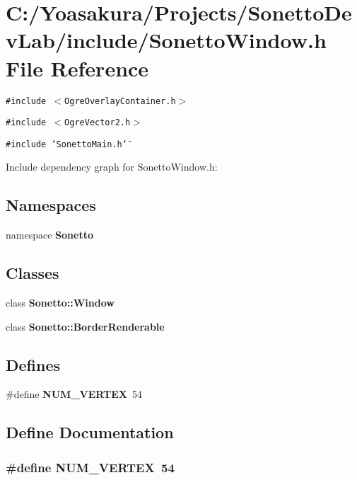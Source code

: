 \section{C:/Yoasakura/Projects/SonettoDevLab/include/SonettoWindow.h File Reference}
\label{_sonetto_window_8h}
{\tt \#include $<$OgreOverlayContainer.h$>$}\par
{\tt \#include $<$OgreVector2.h$>$}\par
{\tt \#include \char`\"{}SonettoMain.h\char`\"{}}\par


Include dependency graph for SonettoWindow.h:\subsection*{Namespaces}
\begin{CompactItemize}
\item 
namespace {\bf Sonetto}
\end{CompactItemize}
\subsection*{Classes}
\begin{CompactItemize}
\item 
class {\bf Sonetto::Window}
\item 
class {\bf Sonetto::BorderRenderable}
\end{CompactItemize}
\subsection*{Defines}
\begin{CompactItemize}
\item 
\#define {\bf NUM\_\-VERTEX}~54
\end{CompactItemize}


\subsection{Define Documentation}
\subsubsection{\setlength{\rightskip}{0pt plus 5cm}\#define NUM\_\-VERTEX~54}\label{_sonetto_window_8h_b722cbfcd174beb57f5473d53f9767f7}


